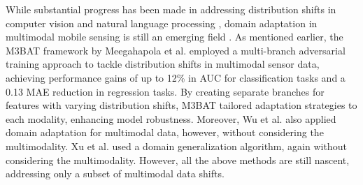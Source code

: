 While substantial progress has been made in addressing distribution shifts in computer vision and natural language processing \cite{wang2018deep, ge2023domain}, domain adaptation in multimodal mobile sensing is still an emerging field \cite{chang2020systematic, meegahapola2024m3bat, wu2023udama}. As mentioned earlier, the M3BAT framework by Meegahapola et al. employed a multi-branch adversarial training approach to tackle distribution shifts in multimodal sensor data, achieving performance gains of up to 12\% in AUC for classification tasks and a 0.13 MAE reduction in regression tasks. By creating separate branches for features with varying distribution shifts, M3BAT tailored adaptation strategies to each modality, enhancing model robustness. Moreover, Wu et al. \cite{wu2023udama} also applied domain adaptation for multimodal data, however, without considering the multimodality. Xu et al. \cite{xu2023globem} used a domain generalization algorithm, again without considering the multimodality. However, all the above methods are still nascent, addressing only a subset of multimodal data shifts. %

